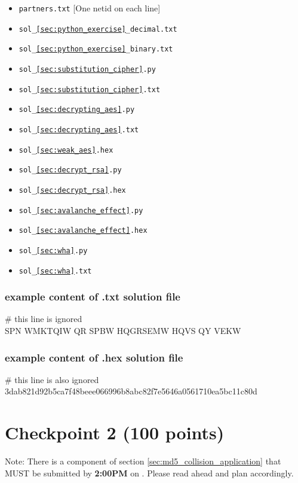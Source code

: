 \documentclass[letterpaper,12pt]{report}
\begin{document}
\begin{itemize}
\item {\tt partners.txt} [One netid on each line]
\item {\tt sol\_\ref{sec:python_exercise}\_decimal.txt}
\item {\tt sol\_\ref{sec:python_exercise}\_binary.txt}
\item {\tt sol\_\ref{sec:substitution_cipher}.py}
\item {\tt sol\_\ref{sec:substitution_cipher}.txt}
\item {\tt sol\_\ref{sec:decrypting_aes}.py}
\item {\tt sol\_\ref{sec:decrypting_aes}.txt}
\item {\tt sol\_\ref{sec:weak_aes}.hex}
\item {\tt sol\_\ref{sec:decrypt_rsa}.py}
\item {\tt sol\_\ref{sec:decrypt_rsa}.hex}
\item {\tt sol\_\ref{sec:avalanche_effect}.py}
\item {\tt sol\_\ref{sec:avalanche_effect}.hex}
\item {\tt sol\_\ref{sec:wha}.py}
\item {\tt sol\_\ref{sec:wha}.txt}
\end{itemize}

\subsubsection*{example content of .txt solution file}
\begin{mdframed}
\# this line is ignored\\
SPN WMKTQIW QR SPBW HQGRSEMW HQVS QY VEKW 
\end{mdframed}
\subsubsection*{example content of .hex solution file}
\begin{mdframed}
\# this line is also ignored \\
3dab821d92b5ca7f48beee066996b8abc82f7e5646a0561710ea5bc11c80d
\end{mdframed}
\medskip



\pagebreak

\section{Checkpoint 2 (100 points)}
Note: There is a component of section \ref{sec:md5_collision_application} that MUST be submitted by \textbf{2:00PM} on \duedate.  Please read ahead and plan accordingly.
\end{document}
